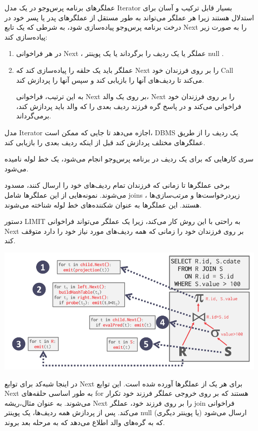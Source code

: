 \pagebreak

عملگرهای برنامه پرس‌وجو در یک مدل Iterator بسیار قابل ترکیب و آسان برای استدلال هستند زیرا هر عملگر می‌تواند به طور مستقل از عملگرهای پدر یا پسر خود در درخت برنامه پرس‌وجو پیاده‌سازی شود، به شرطی که یک تابع Next را به صورت زیر پیاده‌سازی کند:

\begin{enumerate}
	\item 
	در هر فراخوانی Next ، عملگر یا یک ردیف را برگرداند یا یک پوینتر null .
	\item 
	عملگر باید یک حلقه را پیاده‌سازی کند که Next را بر روی فرزندان خود Call می‌کند تا ردیف‌های آنها را بازیابی کند و سپس آنها را پردازش کند.
	
	به این ترتیب، فراخوانی Next بر روی یک والد، Next را بر روی فرزندان خود فراخوانی می‌کند و در پاسخ گره فرزند ردیف بعدی را که والد باید پردازش کند، برمی‌گرداند.
	
\end{enumerate}


مدل Iterator اجازه می‌دهد تا جایی که ممکن است، DBMS یک ردیف را از طریق عملگرهای مختلف پردازش کند قبل از اینکه ردیف بعدی را بازیابی کند. 

سری کارهایی که برای یک ردیف در برنامه پرس‌وجو انجام می‌شود، یک خط لوله نامیده می‌شود.


برخی عملگرها تا زمانی که فرزندان تمام ردیف‌های خود را ارسال کنند، مسدود می‌شوند. نمونه‌هایی از این عملگرها شامل joins ، زیردرخواست‌ها و مرتب‌سازی‌ها هستند. این عملگرها به عنوان شکننده‌های خط لوله شناخته می‌شوند.

دستور LIMIT به راحتی با این روش کار می‌کند، زیرا یک عملگر می‌تواند فراخوانی Next بر روی فرزندان خود را زمانی که همه ردیف‌های مورد نیاز خود را دارد متوقف کند.


\qquad\qquad\qquad	\includegraphics[width=0.7\linewidth]{screenshot001}

در اینجا شبه‌کد برای توابع Next برای هر یک از عملگرها آورده شده است. این توابع Next به طور اساسی حلقه‌های for هستند که بر روی خروجی عملگر فرزند خود تکرار می‌شوند. به عنوان مثال،ریشه Next را بر روی فرزند خود، عملگر join فراخوانی می‌کند. پس از پردازش همه ردیف‌ها، یک پوینتر null (یا پوینتر دیگری) ارسال می‌شود که به گره‌های والد اطلاع می‌دهد که به مرحله بعد بروند.




